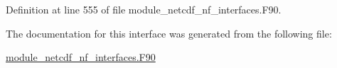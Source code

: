 Definition at line 555 of file module\+\_\+netcdf\+\_\+nf\+\_\+interfaces.\+F90.



The documentation for this interface was generated from the following file\+:\begin{DoxyCompactItemize}
\item 
\hyperlink{module__netcdf__nf__interfaces_8F90}{module\+\_\+netcdf\+\_\+nf\+\_\+interfaces.\+F90}\end{DoxyCompactItemize}
